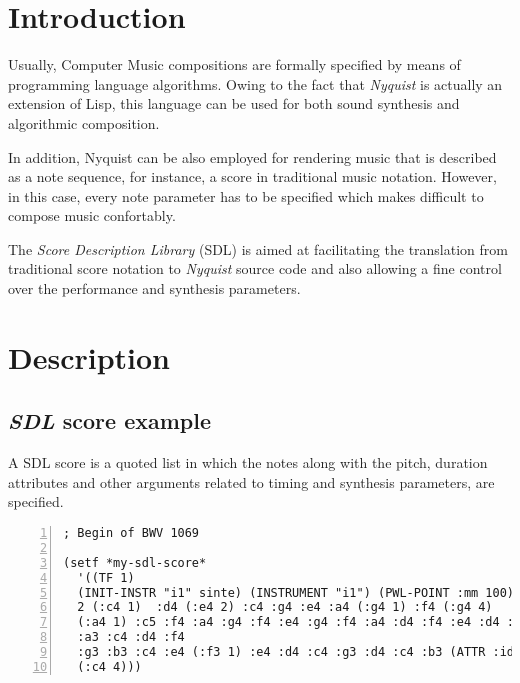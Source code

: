 

\section{Introduction}

Usually, Computer Music compositions are formally specified by means
of programming language algorithms. Owing to the fact that {\it Nyquist} is
actually an extension of Lisp, this language can be used for both
sound synthesis and algorithmic composition.

In addition, Nyquist can be also employed for rendering music that is
described as a note sequence, for instance, a score in traditional
music notation. However, in this case, every note parameter has to be
specified which makes difficult to compose music confortably.

The {\it Score Description Library} (SDL) is aimed at facilitating the
translation from traditional score notation to {\it Nyquist} source
code and also allowing a fine control over the performance and synthesis
parameters.

\section{Description}
\subsection{\textit{SDL} score example}

A SDL score is a quoted list in which the notes along with the pitch, duration attributes and other arguments related to timing and
synthesis parameters, are specified.

\begin{Verbatim}[frame=single,fontsize=\small,numbers=left,numbersep=2mm]
; Begin of BWV 1069

(setf *my-sdl-score*
  '((TF 1)
  (INIT-INSTR "i1" sinte) (INSTRUMENT "i1") (PWL-POINT :mm 100) (ATTR :idur 0.1)
  2 (:c4 1)  :d4 (:e4 2) :c4 :g4 :e4 :a4 (:g4 1) :f4 (:g4 4)
  (:a4 1) :c5 :f4 :a4 :g4 :f4 :e4 :g4 :f4 :a4 :d4 :f4 :e4 :d4 :c4 :d4 :e4 :f4 (:g4 2)
  :a3 :c4 :d4 :f4
  :g3 :b3 :c4 :e4 (:f3 1) :e4 :d4 :c4 :g3 :d4 :c4 :b3 (ATTR :idur 1) (LABEL :t1)
  (:c4 4))) 
\end{Verbatim}

